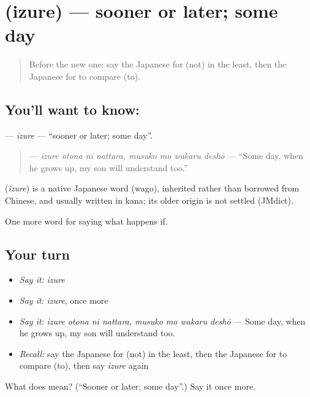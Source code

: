 \section[\texorpdfstring{\ja{いずれ} (izure)}{いずれ (izure)}]{ (izure) — sooner or later; some day}

\label{lesson:JA-C525-izure}



\begin{quote}
Before the new one: say the Japanese for (not) in the least, then the Japanese for to compare (to).
\end{quote}

\subsection*{You'll want to know: }
\textbf{} — \emph{izure} — \textquotedblleft{}sooner or later; some day\textquotedblright{}.

\begin{quote}
\textbf{   } — \emph{izure otona ni nattara, musuko mo wakaru deshō} — \textquotedblleft{}Some day, when he grows up, my son will understand too.\textquotedblright{}
\end{quote}

\begin{cousinweb}
\textbf{} (\emph{izure}) is a native Japanese word (wago), inherited rather than borrowed from Chinese, and usually written in kana; its older origin is not settled (JMdict).
\end{cousinweb}

\begin{grammarlens}[title={What you've built}]
One more word for saying what happens if.
\end{grammarlens}

\subsection*{Your turn}
\begin{itemize}
\raggedright
  \item \emph{Say it:} \emph{izure}
  \item \emph{Say it:} \emph{izure}, once more
  \item \emph{Say it:} \emph{izure otona ni nattara, musuko mo wakaru deshō} — Some day, when he grows up, my son will understand too.
  \item \emph{Recall:} say the Japanese for (not) in the least, then the Japanese for to compare (to), then say \emph{izure} again
\end{itemize}

\begin{tcolorbox}[breakable,colback=teal!4,colframe=teal!35!black,title={Before you move on}]
What does  mean? (\textquotedblleft{}Sooner or later; some day\textquotedblright{}.) Say it once more.
\end{tcolorbox}
